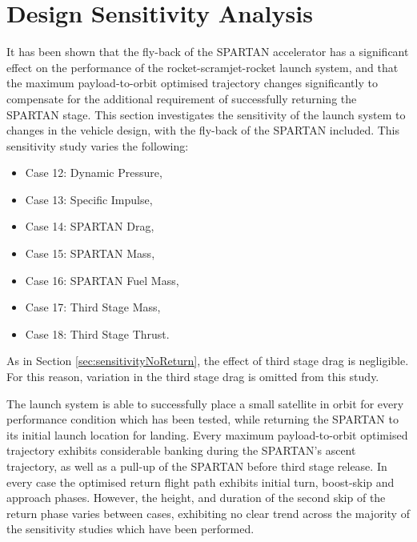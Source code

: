 \section{Design Sensitivity Analysis}\label{sec:sensitivity}

It has been shown that the fly-back of the SPARTAN accelerator has a significant effect on the performance of the rocket-scramjet-rocket launch system, and that the maximum payload-to-orbit optimised trajectory changes significantly to compensate for the additional requirement of successfully returning the SPARTAN stage. This section investigates the sensitivity of the launch system to changes in the vehicle design, with the fly-back of the SPARTAN included. This sensitivity study varies the following:
\begin{itemize}
	\item Case 12: Dynamic Pressure, 
	\item Case 13: Specific Impulse,
	\item Case 14: SPARTAN Drag,
	\item Case 15: SPARTAN Mass,
	\item Case 16: SPARTAN Fuel Mass,
	\item Case 17: Third Stage Mass,
	\item Case 18: Third Stage Thrust.
\end{itemize}
As in Section \ref{sec:sensitivityNoReturn}, the effect of third stage drag is negligible. For this reason, variation in the third stage drag is omitted from this study. 

The launch system is able to successfully place a small satellite in orbit for every performance condition which has been tested, while returning the SPARTAN to its initial launch location for landing. 
Every maximum payload-to-orbit optimised trajectory exhibits considerable banking during the SPARTAN's ascent trajectory, as well as a pull-up of the SPARTAN before third stage release. 
In every case the optimised return flight path exhibits initial turn, boost-skip and approach phases. 
However, the height, and duration of the second skip of the return phase varies between cases, exhibiting no clear trend across the majority of the sensitivity studies which have been performed.


